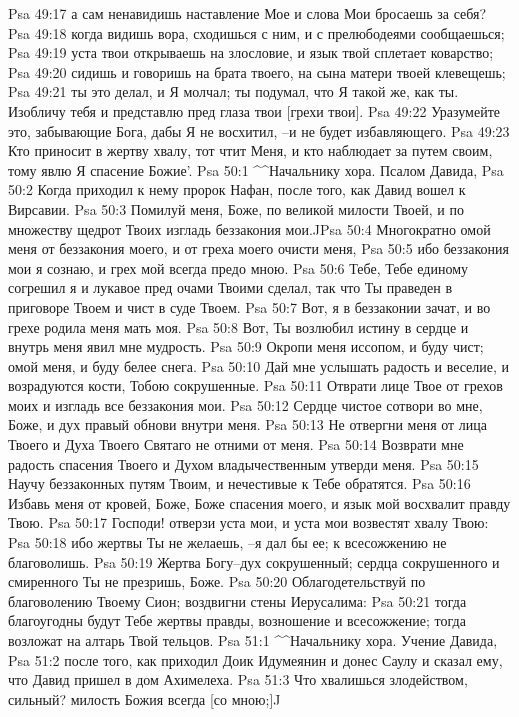 Psa 49:17  а сам ненавидишь наставление Мое и слова Мои бросаешь за себя?
Psa 49:18  когда видишь вора, сходишься с ним, и с прелюбодеями сообщаешься;
Psa 49:19  уста твои открываешь на злословие, и язык твой сплетает коварство;
Psa 49:20  сидишь и говоришь на брата твоего, на сына матери твоей клевещешь;
Psa 49:21  ты это делал, и Я молчал; ты подумал, что Я такой же, как ты. Изобличу тебя и представлю пред глаза твои [грехи твои].
Psa 49:22  Уразумейте это, забывающие Бога, дабы Я не восхитил, --и не будет избавляющего.
Psa 49:23  Кто приносит в жертву хвалу, тот чтит Меня, и кто наблюдает за путем своим, тому явлю Я спасение Божие'.
Psa 50:1  ^^Начальнику хора. Псалом Давида,
Psa 50:2  Когда приходил к нему пророк Нафан, после того, как Давид вошел к Вирсавии.
Psa 50:3  Помилуй меня, Боже, по великой милости Твоей, и по множеству щедрот Твоих изгладь беззакония мои.^^
Psa 50:4  Многократно омой меня от беззакония моего, и от греха моего очисти меня,
Psa 50:5  ибо беззакония мои я сознаю, и грех мой всегда предо мною.
Psa 50:6  Тебе, Тебе единому согрешил я и лукавое пред очами Твоими сделал, так что Ты праведен в приговоре Твоем и чист в суде Твоем.
Psa 50:7  Вот, я в беззаконии зачат, и во грехе родила меня мать моя.
Psa 50:8  Вот, Ты возлюбил истину в сердце и внутрь меня явил мне мудрость.
Psa 50:9  Окропи меня иссопом, и буду чист; омой меня, и буду белее снега.
Psa 50:10  Дай мне услышать радость и веселие, и возрадуются кости, Тобою сокрушенные.
Psa 50:11  Отврати лице Твое от грехов моих и изгладь все беззакония мои.
Psa 50:12  Сердце чистое сотвори во мне, Боже, и дух правый обнови внутри меня.
Psa 50:13  Не отвергни меня от лица Твоего и Духа Твоего Святаго не отними от меня.
Psa 50:14  Возврати мне радость спасения Твоего и Духом владычественным утверди меня.
Psa 50:15  Научу беззаконных путям Твоим, и нечестивые к Тебе обратятся.
Psa 50:16  Избавь меня от кровей, Боже, Боже спасения моего, и язык мой восхвалит правду Твою.
Psa 50:17  Господи! отверзи уста мои, и уста мои возвестят хвалу Твою:
Psa 50:18  ибо жертвы Ты не желаешь, --я дал бы ее; к всесожжению не благоволишь.
Psa 50:19  Жертва Богу--дух сокрушенный; сердца сокрушенного и смиренного Ты не презришь, Боже.
Psa 50:20  Облагодетельствуй по благоволению Твоему Сион; воздвигни стены Иерусалима:
Psa 50:21  тогда благоугодны будут Тебе жертвы правды, возношение и всесожжение; тогда возложат на алтарь Твой тельцов.
Psa 51:1  ^^Начальнику хора. Учение Давида,
Psa 51:2  после того, как приходил Доик Идумеянин и донес Саулу и сказал ему, что Давид пришел в дом Ахимелеха.
Psa 51:3  Что хвалишься злодейством, сильный? милость Божия всегда [со мною;]^^
